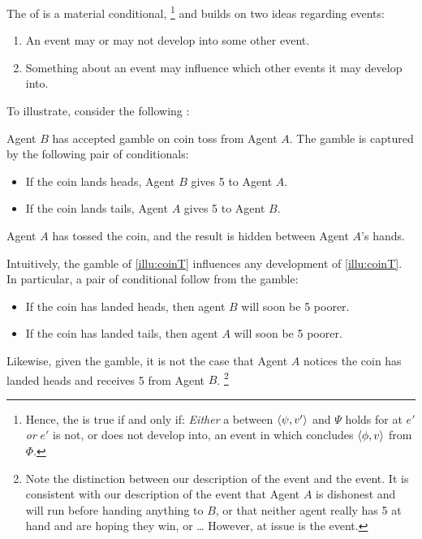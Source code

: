 \begin{note}
  The \itc{} of \qWhyV{} is a material conditional,%
  \footnote{
    Hence, the \itc{} is true if and only if: \emph{Either} a  between \(\langle \psi, v' \rangle\) and \(\Psi\) holds for \vAgent{} at \(e'\) \emph{or} \(e'\) is not, or does not develop into, an event in which \vAgent{} concludes \(\langle \phi, v \rangle\) from \(\Phi\).
  }
  and builds on two ideas regarding events:
  \begin{enumerate}
  \item
    An event may or may not develop into some other event.
  \item
    Something about an event may influence which other events it may develop into.
  \end{enumerate}
  To illustrate, consider the following :

  \begin{scenario}%
    \label{illu:coinT}%
    Agent \(B\) has accepted gamble on coin toss from Agent \(A\).
    The gamble is captured by the following pair of conditionals:
    \begin{itemize}
    \item
      If the coin lands heads, Agent \(B\) gives \texteuro{}5 to Agent \(A\).
    \item
      If the coin lands tails, Agent \(A\) gives \texteuro{}5 to Agent \(B\).
    \end{itemize}
    Agent \(A\) has tossed the coin, and the result is hidden between Agent \(A\)'s hands.
  \end{scenario}

  \noindent%
  Intuitively, the gamble of \autoref{illu:coinT} influences any development of \autoref{illu:coinT}.
  In particular, a pair of conditional follow from the gamble:
  \begin{itemize}
  \item
    If the coin has landed heads, then agent \(B\) will soon be \texteuro{}5 poorer.
  \item
    If the coin has landed tails, then agent \(A\) will soon be \texteuro{}5 poorer.
  \end{itemize}
  Likewise, given the gamble, it is not the case that Agent \(A\) notices the coin has landed heads and receives \texteuro{}5 from Agent \(B\).%
  \footnote{
    \label{fn:desc-con-caveat}
    Note the distinction between our description of the event and the event.
    It is consistent with our description of the event that Agent \(A\) is dishonest and will run before handing anything to \(B\), or that neither agent really has \texteuro{}5 at hand and are hoping they win, or \dots
    However, at issue is the event.
  }


\end{note}
